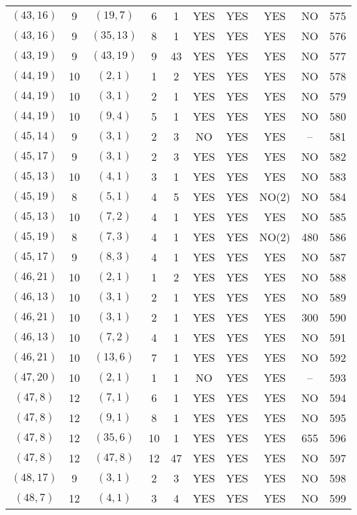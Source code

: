 \begin{longtable}{|c|c|c|c|c|c|c|c|c|c|}
$(43, 16)$ & 9 & $(19, 7)$ & 6 & 1 & YES & YES & YES & NO & 575\\
$(43, 16)$ & 9 & $(35, 13)$ & 8 & 1 & YES & YES & YES & NO & 576\\
$(43, 19)$ & 9 & $(43, 19)$ & 9 & 43 & YES & YES & YES & NO & 577\\
$(44, 19)$ & 10 & $(2, 1)$ & 1 & 2 & YES & YES & YES & NO & 578\\
$(44, 19)$ & 10 & $(3, 1)$ & 2 & 1 & YES & YES & YES & NO & 579\\
$(44, 19)$ & 10 & $(9, 4)$ & 5 & 1 & YES & YES & YES & NO & 580\\
$(45, 14)$ & 9 & $(3, 1)$ & 2 & 3 & NO & YES & YES & -- & 581\\
$(45, 17)$ & 9 & $(3, 1)$ & 2 & 3 & YES & YES & YES & NO & 582\\
$(45, 13)$ & 10 & $(4, 1)$ & 3 & 1 & YES & YES & YES & NO & 583\\
$(45, 19)$ & 8 & $(5, 1)$ & 4 & 5 & YES & YES & NO(2) & NO & 584\\
$(45, 13)$ & 10 & $(7, 2)$ & 4 & 1 & YES & YES & YES & NO & 585\\
$(45, 19)$ & 8 & $(7, 3)$ & 4 & 1 & YES & YES & NO(2) & 480 & 586\\
$(45, 17)$ & 9 & $(8, 3)$ & 4 & 1 & YES & YES & YES & NO & 587\\
$(46, 21)$ & 10 & $(2, 1)$ & 1 & 2 & YES & YES & YES & NO & 588\\
$(46, 13)$ & 10 & $(3, 1)$ & 2 & 1 & YES & YES & YES & NO & 589\\
$(46, 21)$ & 10 & $(3, 1)$ & 2 & 1 & YES & YES & YES & 300 & 590\\
$(46, 13)$ & 10 & $(7, 2)$ & 4 & 1 & YES & YES & YES & NO & 591\\
$(46, 21)$ & 10 & $(13, 6)$ & 7 & 1 & YES & YES & YES & NO & 592\\
$(47, 20)$ & 10 & $(2, 1)$ & 1 & 1 & NO & YES & YES & -- & 593\\
$(47, 8)$ & 12 & $(7, 1)$ & 6 & 1 & YES & YES & YES & NO & 594\\
$(47, 8)$ & 12 & $(9, 1)$ & 8 & 1 & YES & YES & YES & NO & 595\\
$(47, 8)$ & 12 & $(35, 6)$ & 10 & 1 & YES & YES & YES & 655 & 596\\
$(47, 8)$ & 12 & $(47, 8)$ & 12 & 47 & YES & YES & YES & NO & 597\\
$(48, 17)$ & 9 & $(3, 1)$ & 2 & 3 & YES & YES & YES & NO & 598\\
$(48, 7)$ & 12 & $(4, 1)$ & 3 & 4 & YES & YES & YES & NO & 599\\

\end{longtable}
